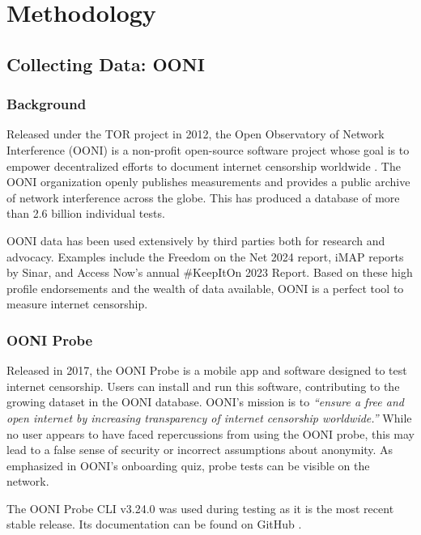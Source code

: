 \chapter{Methodology}
\label{chap:Methodology}

\section{Collecting Data: OONI}

\subsection{Background}
Released under the TOR project in 2012, the Open Observatory of Network Interference (OONI) is a non-profit open-source software project whose goal is to empower decentralized efforts to document internet censorship worldwide \cite{ooniAbout}. The OONI organization openly publishes measurements and provides a public archive of network interference across the globe. This has produced a database of more than 2.6 billion individual tests. \cite{OONIExplorer}

OONI data has been used extensively by third parties both for research and advocacy. Examples include the Freedom on the Net 2024 \cite{freedomhouse2024struggle} report, iMAP reports \cite{ooni2024imap} by Sinar, and Access Now’s annual \#KeepItOn 2023 Report. \cite{accessnow2023keepiton} \cite{ooni2024yearinreview} Based on these high profile endorsements and the wealth of data available, OONI is a perfect tool to measure internet censorship.

\subsection{OONI Probe}
Released in 2017, the OONI Probe is a mobile app and software designed to test internet censorship. Users can install and run this software, contributing to the growing dataset in the OONI database. OONI's mission is to \textit{“ensure a free and open internet by increasing transparency of internet censorship worldwide.”} While no user appears to have faced repercussions from using the OONI probe, this may lead to a false sense of security or incorrect assumptions about anonymity. As emphasized in OONI’s onboarding quiz, probe tests can be visible on the network.

The OONI Probe CLI v3.24.0 was used during testing as it is the most recent stable release. Its documentation can be found on GitHub \cite{oonicli2024}.

